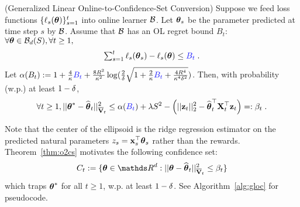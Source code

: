 \begin{thm} \label{thm:o2cs} (Generalized Linear Online-to-Confidence-Set Conversion)
  Suppose we feed loss functions $\{\ell_s({{\boldsymbol \theta}})\}_{s=1}^t$ into online learner $\mathcal{B}$.
  Let ${{\boldsymbol \theta}}_s$ be the parameter predicted at time step $s$ by $\mathcal{B}$.
  Assume that $\mathcal{B}$ has an OL regret bound $B_t$: $\forall {{\boldsymbol \theta}}\in\mathcal{B}_{d}(S), \forall t \ge 1,  $ 
  \begin{equation}\begin{aligned} \label{eq:ol_regret}
    \textstyle\sum_{s=1}^t \ell_s(\th_s) - \ell_s(\th) \le \blue{B_t} \;. 
  \end{aligned}\vspace{2pt}\end{equation}
  Let $\alpha(B_t) := 1 + \fr{4}{\kappa}\blue{B_t} + \fr{8R^2}{\kappa^2} \log(\fr{2}{\dt}\sqrt{ 1+ \fr{2}{\kap}\blue{B_t} + \fr{4R^4}{\kappa^4\dt^2} } )$.
  Then, with probability (w.p.) at least $1-{\delta}$,
  \begin{equation}\label{eq:thm_o2cs}
    \forall t\ge1, ||\th^* - \hth_t||^2_{\barV_t}  \le \alpha(\blue{B_t}) + \lam S^2 - \lt(||\z_{t}||^2_2 - \hth_t^\T\X_{t}^\T\z_{t}  \rt) =: \beta_t \;.
  \end{equation}
\end{thm}
Note that the center of the ellipsoid is the ridge regression estimator on the predicted natural parameters $z_s = \mathbf{x}_s^{\top}{{\boldsymbol \theta}}_s$ rather than the rewards.
Theorem~\ref{thm:o2cs} motivates the following confidence set:
\begin{equation}\begin{aligned} \label{eq:cset}
  C_t := \{ \th\in\dsR^d: ||\th - \hth_{t}||^2_{\barV_t} \le \beta_{t} \}
\end{aligned}\end{equation}
which traps ${{\boldsymbol \theta}}^*$ for all $t\ge1$, w.p. at least $1-{\delta}$.
See Algorithm~\ref{alg:gloc} for pseudocode.
